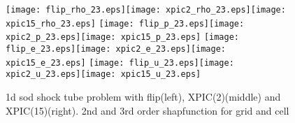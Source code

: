 \documentclass[11pt]{article}
\begin{document}
\begin{figure}
	\begin{center}
		\texttt{[image: flip\_rho\_23.eps]}\texttt{[image: xpic2\_rho\_23.eps]}\texttt{[image: xpic15\_rho\_23.eps]}
		\texttt{[image: flip\_p\_23.eps]}\texttt{[image: xpic2\_p\_23.eps]}\texttt{[image: xpic15\_p\_23.eps]}
		\texttt{[image: flip\_e\_23.eps]}\texttt{[image: xpic2\_e\_23.eps]}\texttt{[image: xpic15\_e\_23.eps]}
		\texttt{[image: flip\_u\_23.eps]}\texttt{[image: xpic2\_u\_23.eps]}\texttt{[image: xpic15\_u\_23.eps]}
		\caption{1d sod shock tube problem with flip(left), XPIC(2)(middle) and XPIC(15)(right). 2nd and 3rd order shapfunction for grid and cell}\label{fig:geo}
	\end{center}
\end{figure}

\clearpage

                                          
\end{document}
